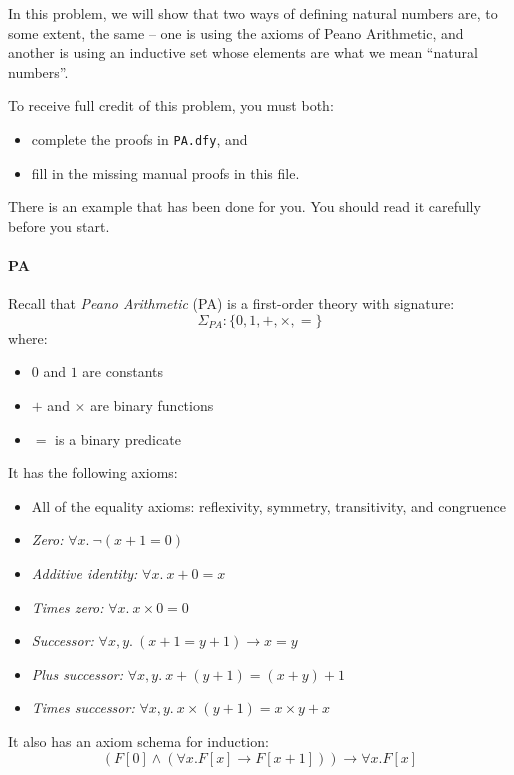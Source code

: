 \documentclass[11pt,a4paper]{article}
\begin{document}
\newpage
{}

In this problem, we will show that two ways of defining natural numbers are, to some extent, the same -- one is using the axioms of Peano Arithmetic, and another is using an inductive set whose elements are what we mean ``natural numbers''.

To receive full credit of this problem, you must both:
\begin{itemize}
    \item complete the proofs in \texttt{PA.dfy}, and
    \item fill in the missing manual proofs in this file.
\end{itemize}
There is an example that has been done for you.
You should read it carefully before you start.

\paragraph*{PA}

Recall that \emph{Peano Arithmetic} (PA) is a first-order theory with signature:
\[
\Sigma_\mathit{PA}: \{0, 1, +, \times, =\}
\]
where:
\begin{itemize}
    \item $0$ and $1$ are constants
    \item $+$ and $\times$ are binary functions
    \item $=$ is a binary predicate
\end{itemize}

It has the following axioms:
\begin{itemize}
    \item All of the equality axioms: reflexivity, symmetry, transitivity, and congruence
    \item \emph{Zero:} $\forall x .~\lnot(x + 1 = 0)$
    \item \emph{Additive identity:} $\forall x .~x + 0 = x$
    \item \emph{Times zero:} $\forall x .~x \times 0 = 0$
    \item \emph{Successor:} $\forall x, y .~(x + 1 = y + 1) \to x = y$
    \item \emph{Plus successor:} $\forall x, y .~x + (y + 1) = (x + y) + 1$
    \item \emph{Times successor:} $\forall x, y .~x \times (y + 1) = x \times y + x$
\end{itemize}
It also has an axiom schema for induction:
\[
(F[0] \land (\forall x . F[x] \to F[x + 1])) \to \forall x . F[x]
\]
\end{document}
